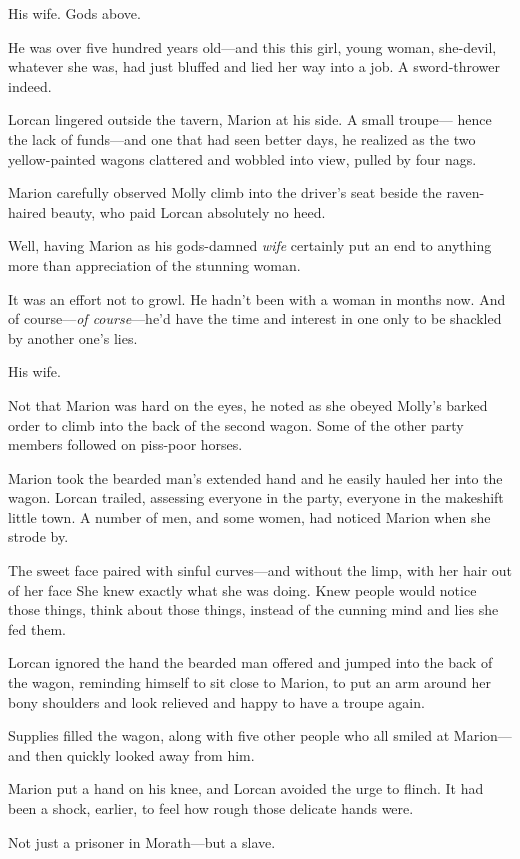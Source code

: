 His wife. Gods above.

He was over five hundred years old---and this  this girl, young woman, she-devil, whatever she was, had just bluffed and lied her way into a job. A sword-thrower indeed.

Lorcan lingered outside the tavern, Marion at his side. A small troupe--- hence the lack of funds---and one that had seen better days, he realized as the two yellow-painted wagons clattered and wobbled into view, pulled by four nags.

Marion carefully observed Molly climb into the driver's seat beside the raven-haired beauty, who paid Lorcan absolutely no heed.

Well, having Marion as his gods-damned \emph{wife} certainly put an end to anything more than appreciation of the stunning woman.

It was an effort not to growl. He hadn't been with a woman in months now. And of course---\emph{of course}---he'd have the time and interest in one  only to be shackled by another one's lies.

His wife.

Not that Marion was hard on the eyes, he noted as she obeyed Molly's barked order to climb into the back of the second wagon. Some of the other party members followed on piss-poor horses.

Marion took the bearded man's extended hand and he easily hauled her into the wagon. Lorcan trailed, assessing everyone in the party, everyone in the makeshift little town. A number of men, and some women, had noticed Marion when she strode by.

The sweet face paired with sinful curves---and without the limp, with her hair out of her face  She knew exactly what she was doing. Knew people would notice those things, think about those things, instead of the cunning mind and lies she fed them.

Lorcan ignored the hand the bearded man offered and jumped into the back of the wagon, reminding himself to sit close to Marion, to put an arm around her bony shoulders and look relieved and happy to have a troupe again.

Supplies filled the wagon, along with five other people who all smiled at Marion---and then quickly looked away from him.

Marion put a hand on his knee, and Lorcan avoided the urge to flinch. It had been a shock, earlier, to feel how rough those delicate hands were.

Not just a prisoner in Morath---but a slave.

